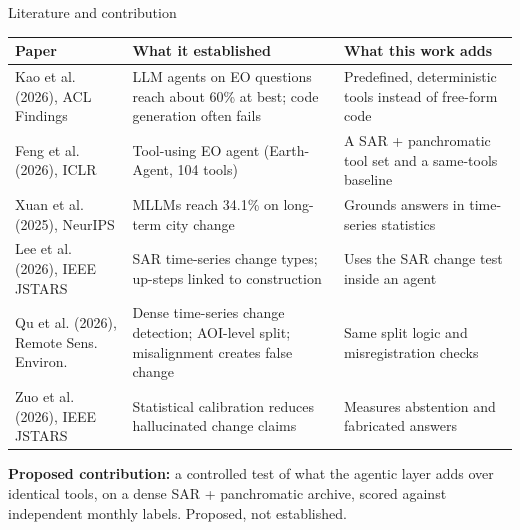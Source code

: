 \documentclass[aspectratio=169,11pt]{beamer}
\begin{document}
\begin{frame}[shrink=14]{Literature and contribution}
\footnotesize
\begin{tabularx}{\textwidth}{@{}p{3.6cm}YY@{}}
\toprule
\textbf{Paper} & \textbf{What it established} & \textbf{What this work adds} \\
\midrule
Kao et al. (2026), ACL Findings & LLM agents on EO questions reach about 60\% at best; code generation often fails & Predefined, deterministic tools instead of free-form code \\
Feng et al. (2026), ICLR & Tool-using EO agent (Earth-Agent, 104 tools) & A SAR + panchromatic tool set and a same-tools baseline \\
Xuan et al. (2025), NeurIPS & MLLMs reach 34.1\% on long-term city change & Grounds answers in time-series statistics \\
Lee et al. (2026), IEEE JSTARS & SAR time-series change types; up-steps linked to construction & Uses the SAR change test inside an agent \\
Qu et al. (2026), Remote Sens. Environ. & Dense time-series change detection; AOI-level split; misalignment creates false change & Same split logic and misregistration checks \\
Zuo et al. (2026), IEEE JSTARS & Statistical calibration reduces hallucinated change claims & Measures abstention and fabricated answers \\
\bottomrule
\end{tabularx}
\vspace{4pt}
\textbf{Proposed contribution:} a controlled test of what the agentic layer adds over identical tools, on a dense SAR + panchromatic archive, scored against independent monthly labels. \alert{Proposed, not established.}
\end{frame}
\end{document}
